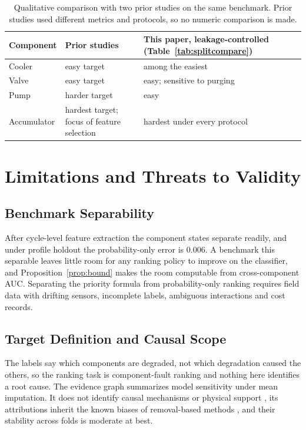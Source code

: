 \documentclass[journal]{IEEEtran}
\begin{document}
\begin{table}[!t]
\centering
\caption{Qualitative comparison with two prior studies on the same benchmark.
Prior studies used different metrics and protocols, so no numeric comparison is
made.}
\label{tab:publishedcomparators}
\footnotesize
\setlength{\tabcolsep}{3pt}
\begin{tabularx}{\columnwidth}{@{}l
  >{\raggedright\arraybackslash}X
  >{\raggedright\arraybackslash}p{}@{}}
\toprule
Component & Prior studies \cite{Helwig2015Hydraulic,Schneider2017FeatureExtraction} & This paper, leakage-controlled (Table~\ref{tab:splitcompare}) \\
\midrule
Cooler & easy target & among the easiest \\
Valve & easy target & easy; sensitive to purging \\
Pump & harder target & easy \\
Accumulator & hardest target; focus of feature selection & hardest under every protocol \\
\bottomrule
\end{tabularx}
\end{table}

\section{Limitations and Threats to Validity}
\label{sec:limitations}

\subsection{Benchmark Separability}
\label{sec:benchmarkseparability}

After cycle-level feature extraction the component states separate readily, and
under profile holdout the probability-only error is 0.006. A benchmark this
separable leaves little room for any ranking policy to improve on the classifier,
and Proposition~\ref{prop:bound} makes the room computable from cross-component AUC.
Separating the priority formula from probability-only ranking requires field data
with drifting sensors, incomplete labels, ambiguous interactions and cost records.

\subsection{Target Definition and Causal Scope}

The labels say which components are degraded, not which degradation caused the
others, so the ranking task is component-fault ranking and nothing here identifies a
root cause. The evidence graph summarizes model sensitivity under mean imputation.
It does not identify causal mechanisms or physical support \cite{Pearl2009Causality},
its attributions inherit the known biases of removal-based methods
\cite{Strobl2007Bias,Hooker2021Unrestricted}, and their stability across folds is
moderate at best.
\end{document}
